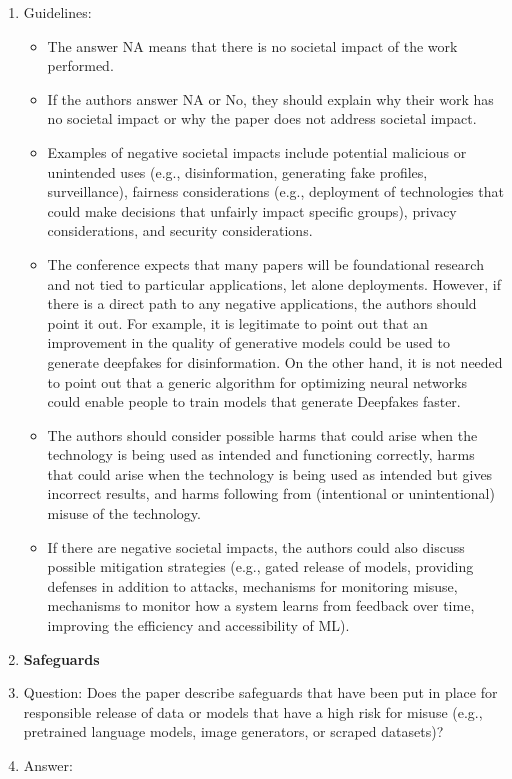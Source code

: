 \documentclass{article}
\begin{document}
\begin{enumerate}
    \item[] Guidelines:
    \begin{itemize}
        \item The answer NA means that there is no societal impact of the work performed.
        \item If the authors answer NA or No, they should explain why their work has no societal impact or why the paper does not address societal impact.
        \item Examples of negative societal impacts include potential malicious or unintended uses (e.g., disinformation, generating fake profiles, surveillance), fairness considerations (e.g., deployment of technologies that could make decisions that unfairly impact specific groups), privacy considerations, and security considerations.
        \item The conference expects that many papers will be foundational research and not tied to particular applications, let alone deployments. However, if there is a direct path to any negative applications, the authors should point it out. For example, it is legitimate to point out that an improvement in the quality of generative models could be used to generate deepfakes for disinformation. On the other hand, it is not needed to point out that a generic algorithm for optimizing neural networks could enable people to train models that generate Deepfakes faster.
        \item The authors should consider possible harms that could arise when the technology is being used as intended and functioning correctly, harms that could arise when the technology is being used as intended but gives incorrect results, and harms following from (intentional or unintentional) misuse of the technology.
        \item If there are negative societal impacts, the authors could also discuss possible mitigation strategies (e.g., gated release of models, providing defenses in addition to attacks, mechanisms for monitoring misuse, mechanisms to monitor how a system learns from feedback over time, improving the efficiency and accessibility of ML).
    \end{itemize}
\item {\bf Safeguards}
    \item[] Question: Does the paper describe safeguards that have been put in place for responsible release of data or models that have a high risk for misuse (e.g., pretrained language models, image generators, or scraped datasets)?
    \item[] Answer: \answerNA{}

\end{enumerate}
\end{document}
